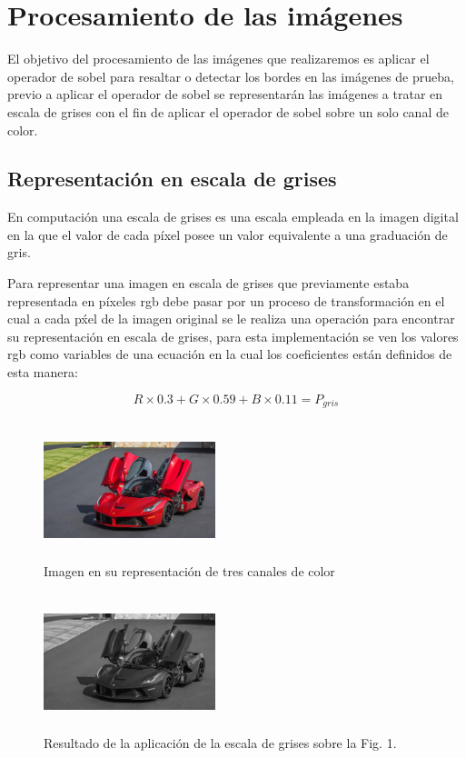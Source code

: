 \documentclass[journal]{IEEEtran}
\begin{document}
\section{Procesamiento de las im\'agenes}

El objetivo del procesamiento de las im\'agenes que realizaremos es aplicar el operador de sobel para  resaltar o detectar los bordes en las im\'agenes de prueba, previo a aplicar el operador de sobel se representarán las im\'agenes a tratar en escala de grises con el fin de aplicar el operador de sobel sobre un solo canal de color.

\subsection{Representaci\'on en escala de grises}

En computaci\'on una escala de grises es una escala empleada en la imagen digital en la que el valor de cada p\'ixel posee un valor equivalente a una graduaci\'on de gris.

Para representar una imagen en escala de grises  que previamente estaba representada en p\'ixeles rgb debe pasar por un proceso de transformaci\'on en el cual a cada p\'xel de la imagen original se le realiza una operaci\'on para encontrar su representaci\'on en escala de grises, para esta implementaci\'on se ven los valores rgb como variables de una ecuaci\'on en la cual los coeficientes est\'an definidos de esta manera:

\[
  R\times0.3+G\times0.59+B\times0.11 = P_{gris}
\]

\begin{figure}[h]
    \centering
    \includegraphics[width=5cm, height=4cm]{color.jpg}
    \caption{Imagen en su representaci\'on de tres canales de color}
    \label{fig:my_label}
\end{figure}

\begin{figure}[h]
    \centering
    \includegraphics[width=5cm, height=4cm]{gray.jpg}
    \caption{Resultado de la aplicaci\'on de la escala de grises sobre la Fig. 1.}
    \label{fig:my_label1}
\end{figure}
\end{document}
